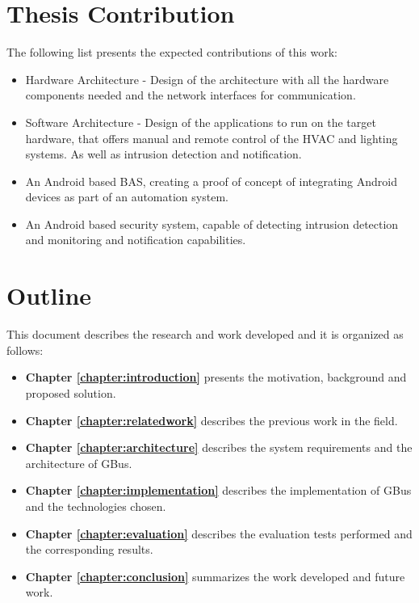 




\section{Thesis Contribution}
\label{section:contribution}

The following list presents the expected contributions of this work:

\begin{itemize}
    \item Hardware Architecture - Design of the architecture with all the hardware components needed and the network interfaces for communication.
    \item Software Architecture - Design of the applications to run on the target hardware, that offers manual and remote control of the HVAC and lighting systems. As well as intrusion detection and notification.
    \item An Android based BAS, creating a proof of concept of integrating Android devices as part of an automation system.
    \item An Android based security system, capable of detecting intrusion detection and monitoring and notification capabilities.
    
\end{itemize}

\section{Outline}
This document describes the research and work developed and it is organized as follows:

\begin{itemize}
\item \textbf{Chapter \ref{chapter:introduction}} presents the motivation, background and proposed solution.
\item \textbf{Chapter \ref{chapter:relatedwork}} describes the previous work in the field.
\item \textbf{Chapter \ref{chapter:architecture}} describes the system requirements and the architecture of GBus.
\item \textbf{Chapter \ref{chapter:implementation}} describes the implementation of GBus and the technologies chosen.
\item \textbf{Chapter \ref{chapter:evaluation}} describes the evaluation tests performed and the corresponding results.
\item \textbf{Chapter \ref{chapter:conclusion}} summarizes the work developed and future work.
\end{itemize}

\cleardoublepage
